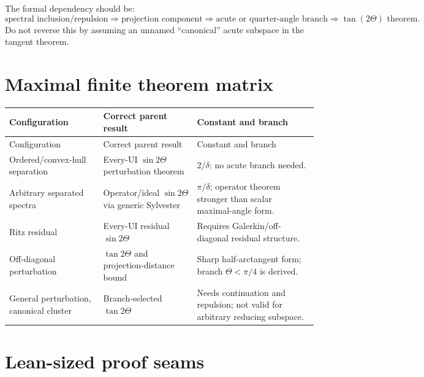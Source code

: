 The formal dependency should be:
\[
  \text{spectral inclusion/repulsion}
  \Longrightarrow
  \text{projection component}
  \Longrightarrow
  \text{acute or quarter-angle branch}
  \Longrightarrow
  \tan(2\Theta)\text{ theorem}.
\]
Do not reverse this by assuming an unnamed ``canonical'' acute subspace in the tangent theorem.

\section{Maximal finite theorem matrix}

\begin{longtable}{@{}p{}p{}p{}@{}}
\toprule Configuration & Correct parent result & Constant and branch \\
\midrule\endfirsthead
\toprule Configuration & Correct parent result & Constant and branch \\
\midrule\endhead
Ordered/convex-hull separation & Every-UI $\sin 2\Theta$ perturbation theorem & $2/\delta$; no acute branch needed. \\
Arbitrary separated spectra & Operator/ideal $\sin 2\Theta$ via generic Sylvester & $\pi/\delta$; operator theorem stronger than scalar maximal-angle form. \\
Ritz residual & Every-UI residual $\sin 2\Theta$ & Requires Galerkin/off-diagonal residual structure. \\
Off-diagonal perturbation & $\tan 2\Theta$ and projection-distance bound & Sharp half-arctangent form; branch $\Theta<\pi/4$ is derived. \\
General perturbation, canonical cluster & Branch-selected $\tan 2\Theta$ & Needs continuation and repulsion; not valid for arbitrary reducing subspace. \\
\bottomrule
\end{longtable}

\section{Lean-sized proof seams}

